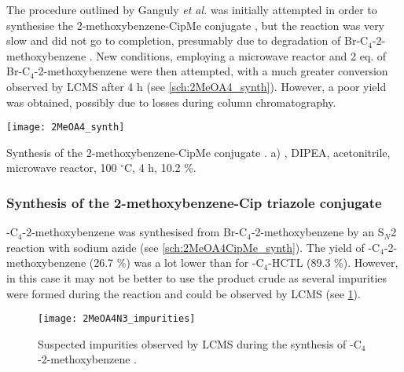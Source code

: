 The procedure outlined by Ganguly \textit{et al.}\cite{Ganguly2011} was initially attempted in order to synthesise the 2-methoxybenzene-CipMe conjugate , but the reaction was very slow and did not go to completion, presumably due to degradation of Br-C$_4$-2-methoxybenzene .
New conditions, employing a microwave reactor and 2 eq. of Br-C$_4$-2-methoxybenzene  were then attempted, with a much greater conversion observed by LCMS after 4 h (see \ref{sch:2MeOA4_synth}). However, a poor yield was obtained, possibly due to losses during column chromatography.

\begin{scheme}[H]
	\begin{center}
		\texttt{[image: 2MeOA4\_synth]}
		\caption{Synthesis of the 2-methoxybenzene-CipMe conjugate . 
		a) , DIPEA, acetonitrile, microwave reactor, 100 $^{\circ}$C, 4 h, 10.2 \%.
		 \label{sch:2MeOA4_synth}}
	\end{center}
\end{scheme}

\subsubsection{Synthesis of the 2-methoxybenzene-Cip triazole conjugate }

-C$_4$-2-methoxybenzene  was synthesised from Br-C$_4$-2-methoxybenzene  by an S$_N$2 reaction with sodium azide (see \ref{sch:2MeOA4CipMe_synth}). The yield of -C$_4$-2-methoxybenzene  (26.7 \%) was a lot lower than for -C$_4$-HCTL  (89.3 \%). However, in this case it may not be better to use the product crude as several impurities were formed during the reaction and could be observed by LCMS (see \ref{fig:2MeOA4N3_impurities}).

\begin{figure}[H]
	\begin{center}
		\texttt{[image: 2MeOA4N3\_impurities]}
		\caption{Suspected impurities observed by LCMS during the synthesis of -C$_4$-2-methoxybenzene .
		\label{fig:2MeOA4N3_impurities}}
	\end{center}
\end{figure}

